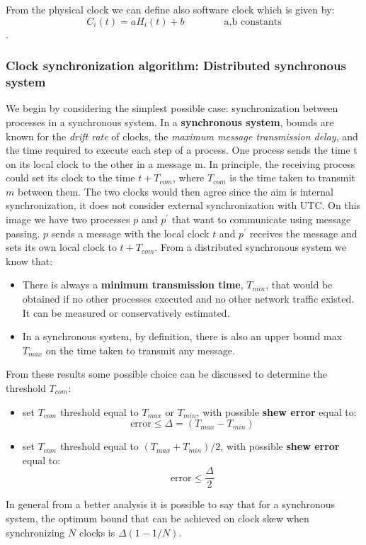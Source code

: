 \documentclass[11pt,a4paper]{article}
\begin{document}
From the physical clock we can define also software clock which is given by: $$C_i(t) = aH_i(t)+b \qquad \qquad \text{a,b constants}$$.

\subsubsection{Clock synchronization algorithm: Distributed synchronous system}
We begin by considering the simplest possible case: synchronization between processes in a synchronous system. In a \textbf{synchronous system}, bounds are known for the\textit{ drift rate} of clocks, the \textit{maximum message transmission delay}, and the time required to execute each step of a process. One process sends the time t on its local clock to the other in a message m. In principle, the receiving process could set its clock to the time $t + T_{com}$, where $T_{com}$ is the time taken to transmit $m$ between them. The two clocks would then agree since the aim is internal synchronization, it does not consider external synchronization with UTC.
On this image we have two processes $p$ and $p^\prime$ that want to communicate using message passing. $p$ sends a message with the local clock $t$ and $p^\prime$ receives the message and sets its own local clock to $t+T_{com}$.
From a distributed synchronous system we know that:
\begin{itemize}
	\item There is always a \textbf{minimum transmission time}, $T_{min}$, that would be obtained if no other processes executed and no other network traffic existed. It can be measured or conservatively estimated.
	\item In a synchronous system, by definition, there is also an upper bound max $T_{max}$ on the time taken to transmit any message.
\end{itemize}
From these results some possible choice can be discussed to determine the threshold $T_{com}$:
\begin{itemize}
	\item set $T_{com}$ threshold equal to $T_{max}$ or $T_{min}$, with possible \textbf{shew error} equal to: $$\text{error} \leq \Delta = (T_{max} - T_{min})$$
	\item set $T_{com}$ threshold equal to $(T_{max} + T_{min})/2$, with possible \textbf{shew error} equal to: $$\text{error} \leq \frac{\Delta}{2}$$
\end{itemize}
In general from a better analysis it is possible to say that for a synchronous system, the optimum bound that can be achieved on clock skew when synchronizing $N$ clocks is $\Delta(1 -1/N)$.
\end{document}
